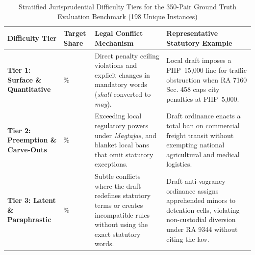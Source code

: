     \begin{table}[htbp]
        \centering
        \small
        \setlength{\tabcolsep}{5pt}
        \caption[Stratified Jurisprudential Difficulty Tiers for Ground Truth Benchmark]{Stratified Jurisprudential Difficulty Tiers for the 350-Pair Ground Truth Evaluation Benchmark (198 Unique Instances)}
        \label{tab:conflict_difficulty_tiers}
        \begin{tabularx}{\linewidth}{>{\RaggedRight}p{3.4cm}>{\centering\arraybackslash}p{1.4cm}>{\RaggedRight}X>{\RaggedRight}p{4.5cm}}
            \toprule
            \textbf{Difficulty Tier} & \textbf{Target Share} & \textbf{Legal Conflict Mechanism} & \textbf{Representative Statutory Example} \\
            \midrule
            \textbf{Tier 1: Surface \& Quantitative} & 30\% & Direct penalty ceiling violations and explicit changes in mandatory words (\textit{shall} converted to \textit{may}). & Local draft imposes a PHP~15,000 fine for traffic obstruction when RA 7160 Sec. 458 caps city penalties at PHP~5,000. \\
            \addlinespace[3pt]
            \textbf{Tier 2: Preemption \& Carve-Outs} & 40\% & Exceeding local regulatory powers under \textit{Magtajas}, and blanket local bans that omit statutory exceptions. & Draft ordinance enacts a total ban on commercial freight transit without exempting national agricultural and medical logistics. \\
            \addlinespace[3pt]
            \textbf{Tier 3: Latent \& Paraphrastic} & 30\% & Subtle conflicts where the draft redefines statutory terms or creates incompatible rules without using the exact statutory words. & Draft anti-vagrancy ordinance assigns apprehended minors to detention cells, violating non-custodial diversion under RA 9344 without citing the law. \\
            \bottomrule
        \end{tabularx}
    \end{table}

